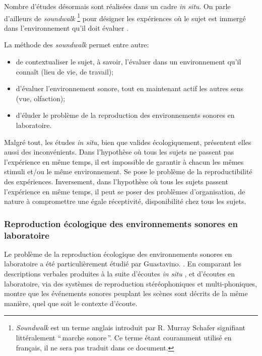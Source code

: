 Nombre d'études désormais sont réalisées dans un cadre \emph{in situ}. On parle d'ailleurs de \emph{soundwalk}  \footnote{\emph{Soundwalk} est un terme anglais introduit par R. Murray Schafer \citep{schafer1969new} signifiant littéralement ``\,marche sonore\,''. Ce terme étant couramment utilisé en français, il ne sera pas traduit dans ce document.} pour désigner les expériences où le sujet est immergé dans l'environnement qu'il doit évaluer \citep{adams2008soundwalking,jeon2013soundwalk}.


La méthode des \emph{soundwalk} permet entre autre:

\begin{itemize}
\item  de contextualiser le sujet, à savoir, l'évaluer dans un environnement qu'il connaît (lieu de vie, de travail);
\item d'évaluer l'environnement sonore, tout en maintenant actif les autres sens (vue, olfaction);
\item d'éluder le problème de la reproduction des environnements sonores en laboratoire.
\end{itemize}

Malgré tout, les études \emph{in situ}, bien que valides écologiquement, présentent elles aussi des inconvénients. Dans l'hypothèse où tous les sujets ne passent pas l'expérience en même temps, il est impossible de garantir à chacun les mêmes stimuli et/ou le même environnement. Se pose le problème de la reproductibilité des expériences. Inversement, dans l'hypothèse où tous les sujets passent l'expérience en même temps, il peut se poser des problèmes d'organisation, de nature à compromettre une égale réceptivité, disponibilité chez tous les sujets.

\subsubsection{Reproduction écologique des environnements sonores en laboratoire}

Le problème de la reproduction écologique des environnements sonores en laboratoire a été particulièrement étudié par Guastavino. \citep{guastavino2003approche,guastavino2004perceptual,guastavino2005ecological}. En comparant les descriptions verbales produites à la suite d'écoutes \emph{in situ} , et d'écoutes en laboratoire, via des systèmes de reproduction stéréophoniques et multi-phoniques, \citep{guastavino2005ecological} montre que les événements sonores peuplant les scènes sont décrits de la même manière, quel que soit le contexte d'écoute.

